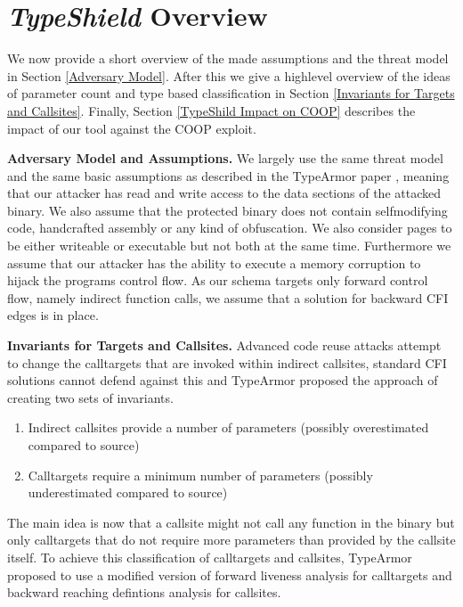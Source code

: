 \section{\textit{TypeShield} Overview}
\label{chapter:TypeShild Overview}
We now provide a short overview of the made assumptions and the threat model in Section \ref{Adversary Model}. After this we give a highlevel overview of the ideas of parameter count and type based classification in Section \ref{Invariants for Targets and Callsites}. Finally, Section \ref{TypeShild Impact on COOP} describes the impact of our tool against the COOP exploit.

\textbf{Adversary Model and Assumptions.}
\label{Adversary Model}
We largely use the same threat model and the same basic assumptions as described in the TypeArmor paper \cite{veen:typearmor}, meaning that our attacker has read and write access to the data sections of the attacked binary.  We also assume that the protected binary does not contain selfmodifying code, handcrafted assembly or any kind of obfuscation. We also consider pages to be either writeable or executable but not both at the same time. Furthermore we assume that our attacker has the ability to execute a memory corruption to hijack the programs control flow. As our schema targets only forward control flow, namely indirect function calls, we assume that a solution for backward CFI edges is in place.


\textbf{Invariants for Targets and Callsites.}
\label{Invariants for Targets and Callsites}
Advanced code reuse attacks attempt to change the calltargets that are invoked within indirect callsites, standard CFI solutions cannot defend against this and TypeArmor proposed the approach of creating two sets of invariants. 

\begin{enumerate}
\item Indirect callsites provide a number of parameters (possibly overestimated compared to source)
\item Calltargets require a minimum number of parameters (possibly underestimated compared to source)
\end{enumerate}

The main idea is now that a callsite might not call any function in the binary but only calltargets that do not require more parameters than provided by the callsite itself. To achieve this classification of calltargets and callsites, TypeArmor proposed to use a modified version of forward liveness analysis for calltargets and backward reaching defintions analysis for callsites.


